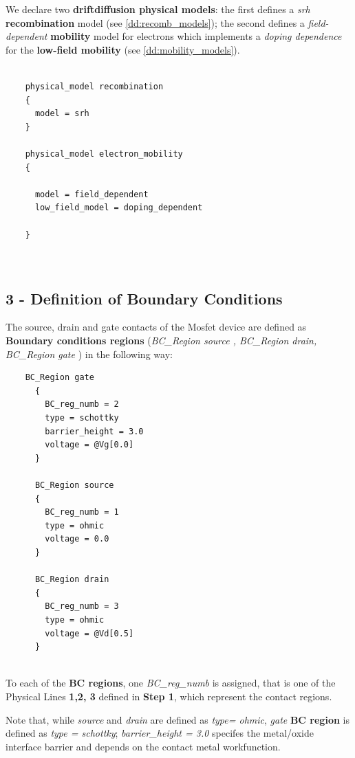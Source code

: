 We declare two \textbf{driftdiffusion physical models}:
 the  first defines a   \textit{srh} \textbf{recombination}  model (see \ref{dd:recomb_models}); the  second 
defines a \textit{field-dependent} \textbf{mobility} model for  electrons which implements a \textit{doping  dependence} for the \textbf{low-field  mobility} (see \ref{dd:mobility_models}).


\begin{verbatim}

    physical_model recombination
    {
      model = srh
    }

    physical_model electron_mobility
    {

      model = field_dependent
      low_field_model = doping_dependent   

    }



\end{verbatim}

\subsection* {3 - Definition of Boundary Conditions}
The source, drain  and gate contacts of the Mosfet device  are defined as \textbf{Boundary conditions regions} (\textit{BC\_Region source , BC\_Region drain, BC\_Region gate }) in the following way:

\begin{verbatim}
    BC_Region gate
      {
        BC_reg_numb = 2
        type = schottky
        barrier_height = 3.0
        voltage = @Vg[0.0]
      }

      BC_Region source
      {
        BC_reg_numb = 1
        type = ohmic
        voltage = 0.0
      }
 
      BC_Region drain
      {
        BC_reg_numb = 3
        type = ohmic
        voltage = @Vd[0.5]
      }


\end{verbatim}

To each of the  \textbf{BC regions}, one \textit{BC\_reg\_numb} is  assigned,  that  is  one  of the Physical Lines \textbf{1,2, 3} defined in \textbf{Step 1}, which represent the contact regions.

Note that, while \textit{source} and \textit{drain} are defined as \textit{type= ohmic},  \textit{gate} \textbf{BC region} is defined as \textit{type = schottky};
\textit{barrier\_height = 3.0} specifes the metal/oxide interface barrier and depends on the contact metal workfunction.

